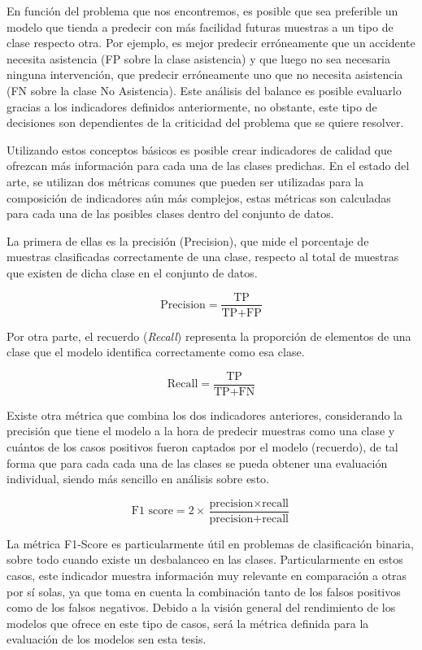 En función del problema que nos encontremos, es posible que sea preferible un modelo que tienda a predecir con más facilidad futuras muestras a un tipo de clase respecto otra. Por ejemplo, es mejor predecir erróneamente que un accidente necesita asistencia (FP sobre la clase asistencia) y que luego no sea necesaria ninguna intervención, que predecir erróneamente uno que no necesita asistencia (FN sobre la clase No Asistencia). Este análisis del balance es posible evaluarlo gracias a los indicadores definidos anteriormente, no obstante, este tipo de decisiones son dependientes de la criticidad del problema que se quiere resolver.

Utilizando estos conceptos básicos es posible crear indicadores de calidad que ofrezcan más información para cada una de las clases predichas. En el estado del arte, se utilizan dos métricas comunes que pueden ser utilizadas para la composición de indicadores aún más complejos, estas métricas son calculadas para cada una de las posibles clases dentro del conjunto de datos.

La primera de ellas es la precisión (Precision), que mide el porcentaje de muestras clasificadas correctamente de una clase, respecto al total de muestras que existen de dicha clase en el conjunto de datos.

$$\text{Precision} = \frac{{\text{TP}}}{{\text{TP} + \text{FP}}}$$

Por otra parte, el recuerdo (\textit{Recall}) representa la proporción de elementos de una clase que el modelo identifica correctamente como esa clase.

$$\text{Recall} = \frac{{\text{TP}}}{{\text{TP} + \text{FN}}}$$

Existe otra métrica que combina los dos indicadores anteriores, considerando la precisión que tiene el modelo a la hora de predecir muestras como una clase y cuántos de los casos positivos fueron captados por el modelo (recuerdo), de tal forma que para cada cada una de las clases se pueda obtener una evaluación individual, siendo más sencillo en análisis sobre esto. 

$$\text{F1 score} = 2 \times \frac{{\text{precision} \times \text{recall}}}{{\text{precision} + \text{recall}}}$$




La métrica F1-Score es particularmente útil en problemas de clasificación binaria, sobre todo cuando existe un desbalanceo en las clases. Particularmente en estos casos, este indicador muestra información muy relevante en comparación a otras por sí solas, ya que toma en cuenta la combinación tanto de los falsos positivos como de los falsos negativos. Debido a la visión general del rendimiento de los modelos que ofrece en este tipo de casos, será la métrica definida para la evaluación de los modelos sen esta tesis.


